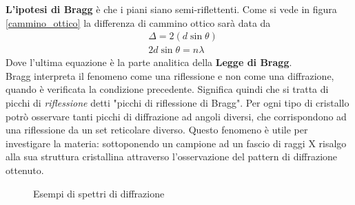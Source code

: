 \textbf{L'ipotesi di Bragg} è che i piani siano semi-riflettenti.
Come si vede in figura \ref{cammino_ottico} la differenza di cammino ottico sarà data da
\begin{equation}
\begin{split}
& \Delta = 2 (d \sin\theta) \\ 
& 2 d \sin\theta = n \lambda 
\end{split}
\end{equation}
Dove l'ultima equazione è la parte analitica della \textbf{Legge di Bragg}. \\
Bragg interpreta il fenomeno come una riflessione e non come una diffrazione, quando è verificata la condizione precedente.
Significa quindi che si tratta di picchi di \textit{riflessione} detti "picchi di riflessione di Bragg".
Per ogni tipo di cristallo potrò osservare tanti picchi di diffrazione ad angoli diversi, che corrispondono ad una riflessione da un set reticolare diverso.
Questo fenomeno è utile per investigare la materia:
sottoponendo un campione ad un fascio di raggi X risalgo alla sua struttura cristallina attraverso l'osservazione del pattern di diffrazione ottenuto.

\begin{figure}[h]
    \centering
    \caption{Esempi di spettri di diffrazione}
    \label{es_diff}
\end{figure}
